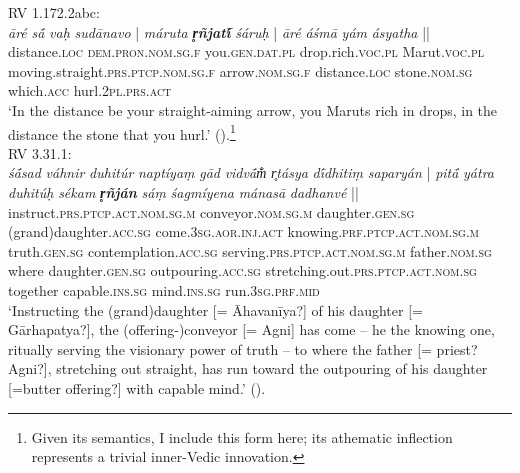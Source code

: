 \documentclass[output=paper,colorlinks,citecolor=brown]{langscibook}
\begin{document}
\begin{exe}
\begin{xlist}
RV 1.172.2abc:\\
\gll \textit{āré} \textit{s{ā́}} \textit{vaḥ} {\textit{sudānavo} |} \textit{máruta} {\textbf{\textit{r̥ñjatī́}} } {\textit{śáruḥ} |} \textit{āré} \textit{áśmā} \textit{yám} {\textit{ásyatha} ||}\\
distance.\textsc{loc} \textsc{dem.pron.nom.sg.f} you.\textsc{gen.dat.pl} drop.rich.\textsc{voc.pl} Marut.\textsc{voc.pl} moving.straight.\textsc{prs.ptcp.nom.sg.f} arrow.\textsc{nom.sg.f} distance.\textsc{loc} stone.\textsc{nom.sg} which.\textsc{acc} hurl.\textsc{2pl.prs.act}\\ 
\glt `In the distance be your straight-aiming arrow, you Maruts rich in drops, in the distance the stone that you hurl.' (\citealt{JamisonBrereton2014}).\footnote{Given its  semantics, I include this form here; its athematic inflection represents a trivial inner-Vedic innovation.}\\

\newpage
RV 3.31.1:\\ 
\gll \textit{ś{ā́}sad} \textit{váhnir} \textit{duhitúr} \textit{naptíyaṃ} \textit{gād}  \textit{vidv{ā́}m̐} \textit{r̥tásya} \textit{dī́dhitiṃ} {\textit{saparyán} |}  \textit{pit{ā́}} \textit{yátra} \textit{duhitúḥ} \textit{sékam} {\textbf{\textit{r̥ñján}} } \textit{sáṃ} \textit{śagmíyena} \textit{mánasā} {\textit{dadhanvé} ||}\\
instruct.\textsc{prs.ptcp.act.nom.sg.m} conveyor.\textsc{nom.sg.m} daughter.\textsc{gen.sg} (grand)daughter.\textsc{acc.sg} come.\textsc{3sg.aor.inj.act} knowing.\textsc{prf.ptcp.act.nom.sg.m} truth.\textsc{gen.sg} contemplation.\textsc{acc.sg} serving.\textsc{prs.ptcp.act.nom.sg.m} father.\textsc{nom.sg} where daughter.\textsc{gen.sg} outpouring.\textsc{acc.sg} stretching.out.\textsc{prs.ptcp.act.nom.sg} together capable.\textsc{ins.sg} mind.\textsc{ins.sg} run.\textsc{3sg.prf.mid}\\
\glt `Instructing the (grand)daughter [= Āhavanīya?] of his daughter [= Gārhapatya?], the (offering-)conveyor [= Agni] has come -- he the knowing one, ritually serving the visionary power of truth -- to where the father [= priest? Agni?], stretching out straight, has run toward the outpouring of his daughter [=butter offering?] with capable mind.' (\citealt{JamisonBrereton2014}).\\
\smallskip


\end{xlist}
\end{exe}
\end{document}
